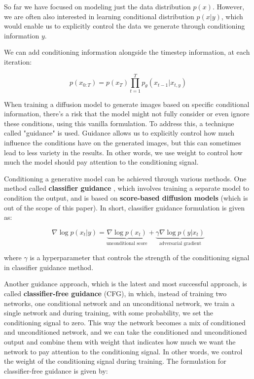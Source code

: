 \label{subsec:classifier_free_diffusion_guidance}

So far we have focused on modeling just the data distribution $p(x)$. However, we are often also interested in learning conditional distribution $p(x|y)$, which would enable us to explicitly control the data we generate through conditioning information $y$.

We can add conditioning information alongside the timestep information, at each iteration:

\[
p(x_{0:T}) = p(x_T) \prod_{t=1}^{T} p_\theta (x_{t-1} | x_{t, y})
\]

When training a diffusion model to generate images based on specific conditional information, there's a risk that the model might not fully consider or even ignore these conditions, using this vanilla formulation. To address this, a technique called "guidance" is used. Guidance allows us to explicitly control how much influence the conditions have on the generated images, but this can sometimes lead to less variety in the results. In other words, we use weight to control how much the model should pay attention to the conditioning signal.

Conditioning a generative model can be achieved through various methods. One method called \textbf{classifier guidance} \cite{openai_diffusion_beats_gans} \cite{score_based_generative_modeling} \cite{openai_diffusion_beats_gans}, which involves training a separate model to condition the output, and is based on \textbf{score-based diffusion models} \cite{score_based_generative_modeling} (which is out of the scope of this paper). In short, classifier guidance formulation is given as:

\[
\nabla \log p(x_t | y) = \underbrace{\nabla \log p(x_t)}_{\text{unconditional score}} + \underbrace{\gamma \nabla \log p(y | x_t)}_{\text{adversarial gradient}}
\]

where $\gamma$ is a hyperparameter that controls the strength of the conditioning signal in classifier guidance method.

Another guidance approach, which is the latest and most successful approach, is called \textbf{classifier-free guidance} \cite{classifier_free_guidance} (CFG), in which, instead of training two networks, one conditional network and an unconditional network, we train a single network and during training, with some probability, we set the conditioning signal to zero. This way the network becomes a mix of conditioned and unconditioned network, and we can take the conditioned and unconditioned output and combine them with weight that indicates how much we want the network to pay attention to the conditioning signal. In other words, we control the weight of the conditioning signal during training. The formulation for classifier-free guidance is given by:

